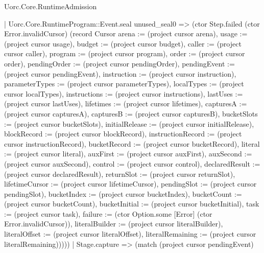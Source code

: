 \begin{lexlean}{Uorc.Core.RuntimeAdmission}
\begin{semanticmodule}
{          | Uorc.Core.RuntimeProgram::Event.seal unused_seal0 => (ctor Step.failed (ctor Error.invalidCursor) (record Cursor {arena := (project cursor arena), usage := (project cursor usage), budget := (project cursor budget), caller := (project cursor caller), program := (project cursor program), order := (project cursor order), pendingOrder := (project cursor pendingOrder), pendingEvent := (project cursor pendingEvent), instruction := (project cursor instruction), parameterTypes := (project cursor parameterTypes), localTypes := (project cursor localTypes), instructions := (project cursor instructions), lastUses := (project cursor lastUses), lifetimes := (project cursor lifetimes), capturesA := (project cursor capturesA), capturesB := (project cursor capturesB), bucketSlots := (project cursor bucketSlots), initialRelease := (project cursor initialRelease), blockRecord := (project cursor blockRecord), instructionRecord := (project cursor instructionRecord), bucketRecord := (project cursor bucketRecord), literal := (project cursor literal), auxFirst := (project cursor auxFirst), auxSecond := (project cursor auxSecond), control := (project cursor control), declaredResult := (project cursor declaredResult), returnSlot := (project cursor returnSlot), lifetimeCursor := (project cursor lifetimeCursor), pendingSlot := (project cursor pendingSlot), bucketIndex := (project cursor bucketIndex), bucketCount := (project cursor bucketCount), bucketInitial := (project cursor bucketInitial), task := (project cursor task), failure := (ctor Option.some [Error] (ctor Error.invalidCursor)), literalBuilder := (project cursor literalBuilder), literalOffset := (project cursor literalOffset), literalRemaining := (project cursor literalRemaining)}))))
      | Stage.capture => (match (project cursor pendingEvent)
}
\end{semanticmodule}
\end{lexlean}
